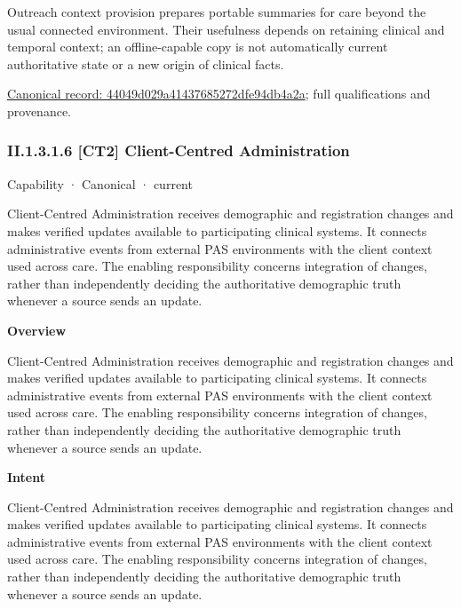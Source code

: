 Outreach context provision prepares portable summaries for care beyond the usual connected environment. Their usefulness depends on retaining clinical and temporal context; an offline-capable copy is not automatically current authoritative state or a new origin of clinical facts.


{\footnotesize \href{../../../../continuum/strategy/capability/feature/44049d029a41437685272dfe94db4a2a.md}{Canonical record: 44049d029a41437685272dfe94db4a2a}; full qualifications and provenance.}\par
\subsubsection*{II.1.3.1.6 [CT2] Client-Centred Administration}
\label{navigation:II.1.3.1.6}

\label{element:8752b7a937754b2faa296300c6a48911}
{\small Capability · Canonical · current}\par

Client-Centred Administration receives demographic and registration changes and makes verified updates available to participating clinical systems. It connects administrative events from external PAS environments with the client context used across care. The enabling responsibility concerns integration of changes, rather than independently deciding the authoritative demographic truth whenever a source sends an update.



\textbf{Overview}



Client-Centred Administration receives demographic and registration changes and makes verified updates available to participating clinical systems. It connects administrative events from external PAS environments with the client context used across care. The enabling responsibility concerns integration of changes, rather than independently deciding the authoritative demographic truth whenever a source sends an update.



\textbf{Intent}



Client-Centred Administration receives demographic and registration changes and makes verified updates available to participating clinical systems. It connects administrative events from external PAS environments with the client context used across care. The enabling responsibility concerns integration of changes, rather than independently deciding the authoritative demographic truth whenever a source sends an update.



